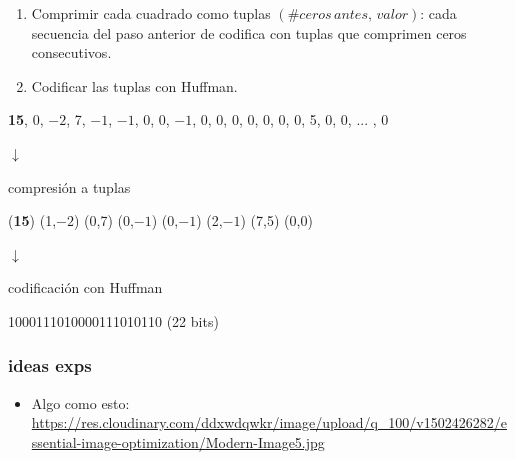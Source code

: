 \documentclass{beamer}
\begin{document}
\begin{frame}
    \begin{enumerate}\addtocounter{enumi}{2}
        \item Comprimir cada cuadrado como tuplas $(\# ceros \, antes, \, valor)$: cada secuencia del paso anterior de codifica con tuplas que comprimen ceros consecutivos.

        \item Codificar las tuplas con Huffman.
    \end{enumerate}

    \vfill
    \begin{center}
        \textbf{15}, {\color{red} 0}, $-2$, 7, $-1$, $-1$, {\color{red} 0}, {\color{red} 0}, $-1$, {\color{red} 0}, {\color{red} 0}, {\color{red} 0}, {\color{red} 0}, {\color{red} 0}, {\color{red} 0}, {\color{red} 0}, 5, {\color{red} 0}, {\color{red} 0}, ... , {\color{red} 0}

        \vfill
        $\downarrow$

        {\tiny compresión a tuplas}
        \vfill

        (\textbf{15}) ({\color{red}1},$-2$) ({\color{red}0},7) ({\color{red}0},$-1$) ({\color{red}0},$-1$) ({\color{red}2},$-1$) ({\color{red}7},5) {\color{red}(0,0)}

        \vfill
        $\downarrow$

        {\tiny codificación con Huffman}
        \vfill

        1000111010000111010110 (22 bits)
    \end{center}
\end{frame}

\begin{frame}
    \frametitle{ideas exps}
    \begin{itemize}
        \item Algo como esto:
            \url{https://res.cloudinary.com/ddxwdqwkr/image/upload/q_100/v1502426282/essential-image-optimization/Modern-Image5.jpg}
    \end{itemize}

\end{frame}
\end{document}
